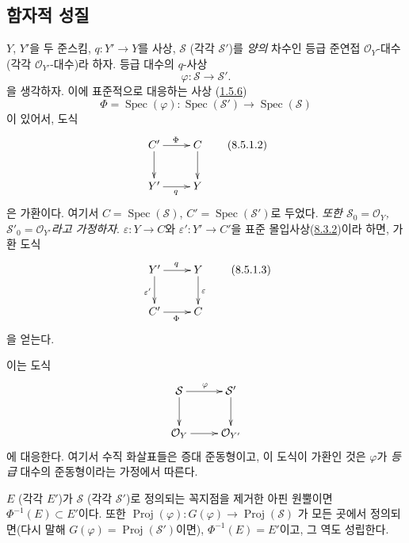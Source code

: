 \subsection{함자적 성질}
\label{subsection:II.8.5-ko}

\begin{env}[8.5.1]
\label{II.8.5.1-ko}
$Y$, $Y'$을 두 준스킴, $q:Y'\to Y$를 사상,
$\mathcal{S}$ (각각 $\mathcal{S}'$)를 \emph{양의} 차수인 등급 준연접
$\mathcal{O}_Y$-대수(각각 $\mathcal{O}_{Y'}$-대수)라 하자.
등급 대수의 $q$-사상
\begin{equation}
\label{II.8.5.1.1-ko}
  \varphi:\mathcal{S}\to\mathcal{S}'.
\tag{8.5.1.1}
\end{equation}
을 생각하자. 이에 표준적으로 대응하는 사상
(\hyperref[II.1.5.6-ko]{1.5.6})
\[
  \Phi=\operatorname{Spec}(\varphi):
  \operatorname{Spec}(\mathcal{S}')\to\operatorname{Spec}(\mathcal{S})
\]
이 있어서, 도식
\begin{equation}
\label{II.8.5.1.2-ko}
  \xymatrix{
    C'\ar[r]^{\Phi}\ar[d] & C\ar[d]\\
    Y'\ar[r]_{q} & Y
  }
\tag{8.5.1.2}
\end{equation}
은 가환이다. 여기서
$C=\operatorname{Spec}(\mathcal{S})$,
$C'=\operatorname{Spec}(\mathcal{S}')$로 두었다.
\emph{또한
$\mathcal{S}_0=\mathcal{O}_Y$, $\mathcal{S}'_0=\mathcal{O}_{Y'}$라고
가정하자}. $\varepsilon:Y\to C$와 $\varepsilon':Y'\to C'$을 표준
몰입사상(\hyperref[II.8.3.2-ko]{8.3.2})이라 하면, 가환 도식
\begin{equation}
\label{II.8.5.1.3-ko}
  \xymatrix{
    Y'\ar[r]^{q}\ar[d]_{\varepsilon'} & Y\ar[d]^{\varepsilon}\\
    C'\ar[r]_{\Phi} & C
  }
\tag{8.5.1.3}
\end{equation}
을 얻는다.

이는 도식
\[
  \xymatrix{
    \mathcal{S}\ar[r]^{\varphi}\ar[d] & \mathcal{S}'\ar[d]\\
    \mathcal{O}_Y\ar[r] & \mathcal{O}_{Y'}
  }
\]
에 대응한다. 여기서 수직 화살표들은 증대 준동형이고, 이 도식이
가환인 것은 $\varphi$가 \emph{등급} 대수의 준동형이라는 가정에서
따른다.
\end{env}

\begin{proposition}[8.5.2]
\label{II.8.5.2-ko}
$E$ (각각 $E'$)가 $\mathcal{S}$ (각각 $\mathcal{S}'$)로 정의되는
꼭지점을 제거한 아핀 원뿔이면 $\Phi^{-1}(E)\subset E'$이다. 또한
$\operatorname{Proj}(\varphi):G(\varphi)\to\operatorname{Proj}(\mathcal{S})$
가 모든 곳에서 정의되면(다시 말해
$G(\varphi)=\operatorname{Proj}(\mathcal{S}')$이면),
$\Phi^{-1}(E)=E'$이고, 그 역도 성립한다.
\end{proposition}

